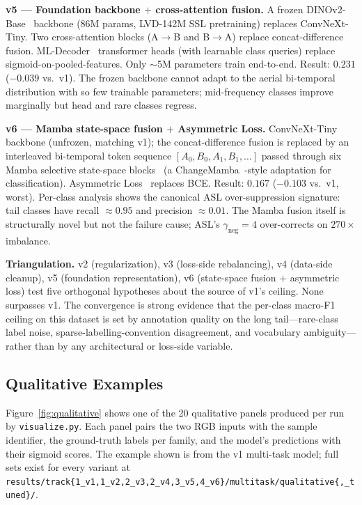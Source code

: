 \documentclass[journal]{IEEEtran}
\begin{document}
\textbf{v5 — Foundation backbone $+$ cross-attention fusion.} A frozen DINOv2-Base~\cite{oquab2024dinov2} backbone (86M params, LVD-142M SSL pretraining) replaces ConvNeXt-Tiny. Two cross-attention blocks (A$\to$B and B$\to$A) replace concat-difference fusion. ML-Decoder~\cite{ridnik2023mldecoder} transformer heads (with learnable class queries) replace sigmoid-on-pooled-features. Only $\sim$5M parameters train end-to-end. Result: $0.231$ ($-0.039$ vs.\ v1). The frozen backbone cannot adapt to the aerial bi-temporal distribution with so few trainable parameters; mid-frequency classes improve marginally but head and rare classes regress.

\textbf{v6 — Mamba state-space fusion $+$ Asymmetric Loss.} ConvNeXt-Tiny backbone (unfrozen, matching v1); the concat-difference fusion is replaced by an interleaved bi-temporal token sequence $[A_0, B_0, A_1, B_1, \ldots]$ passed through six Mamba selective state-space blocks~\cite{gu2023mamba} (a ChangeMamba~\cite{chen2024changemamba}-style adaptation for classification). Asymmetric Loss~\cite{ridnik2021asl} replaces BCE. Result: $0.167$ ($-0.103$ vs.\ v1, worst). Per-class analysis shows the canonical ASL over-suppression signature: tail classes have recall $\approx 0.95$ and precision $\approx 0.01$. The Mamba fusion itself is structurally novel but not the failure cause; ASL's $\gamma_\mathrm{neg}{=}4$ over-corrects on $270{\times}$ imbalance.

\textbf{Triangulation.} v2 (regularization), v3 (loss-side rebalancing), v4 (data-side cleanup), v5 (foundation representation), v6 (state-space fusion $+$ asymmetric loss) test five orthogonal hypotheses about the source of v1's ceiling. None surpasses v1. The convergence is strong evidence that the per-class macro-F1 ceiling on this dataset is set by annotation quality on the long tail---rare-class label noise, sparse-labelling-convention disagreement, and vocabulary ambiguity---rather than by any architectural or loss-side variable.

\subsection{Qualitative Examples}\label{ssec:qualitative}

Figure~\ref{fig:qualitative} shows one of the 20 qualitative panels produced per run by \texttt{visualize.py}. Each panel pairs the two RGB inputs with the sample identifier, the ground-truth labels per family, and the model's predictions with their sigmoid scores. The example shown is from the v1 multi-task model; full sets exist for every variant at \texttt{results/track\{1\_v1,1\_v2,2\_v3,2\_v4,3\_v5,4\_v6\}/multitask/qualitative\{,\_tuned\}/}.
\end{document}
